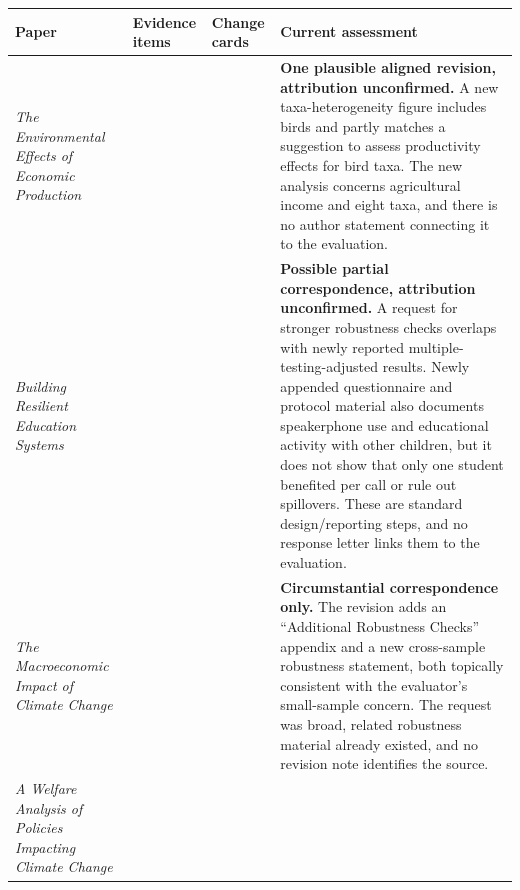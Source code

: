 \documentclass[
  11pt,
  letterpaper,
]{article}
\begin{document}
\begin{longtable}[]{@{}
  >{\raggedright\arraybackslash}p{}
  >{\raggedleft\arraybackslash}p{}
  >{\raggedleft\arraybackslash}p{}
  >{\raggedright\arraybackslash}p{}@{}}
\toprule\noalign{}
\begin{minipage}[b]{\linewidth}\raggedright
Paper
\end{minipage} & \begin{minipage}[b]{\linewidth}\raggedleft
Evidence items
\end{minipage} & \begin{minipage}[b]{\linewidth}\raggedleft
Change cards
\end{minipage} & \begin{minipage}[b]{\linewidth}\raggedright
Current assessment
\end{minipage} \\
\midrule\noalign{}
\endhead
\bottomrule\noalign{}
\endlastfoot
\emph{The Environmental Effects of Economic Production} & 4 & 28 &
\textbf{One plausible aligned revision, attribution unconfirmed.} A new
taxa-heterogeneity figure includes birds and partly matches a suggestion
to assess productivity effects for bird taxa. The new analysis concerns
agricultural income and eight taxa, and there is no author statement
connecting it to the evaluation. \\
\emph{Building Resilient Education Systems} & 10 & 10 & \textbf{Possible
partial correspondence, attribution unconfirmed.} A request for stronger
robustness checks overlaps with newly reported multiple-testing-adjusted
results. Newly appended questionnaire and protocol material also
documents speakerphone use and educational activity with other children,
but it does not show that only one student benefited per call or rule
out spillovers. These are standard design/reporting steps, and no
response letter links them to the evaluation. \\
\emph{The Macroeconomic Impact of Climate Change} & 6 & 7 &
\textbf{Circumstantial correspondence only.} The revision adds an
``Additional Robustness Checks'' appendix and a new cross-sample
robustness statement, both topically consistent with the evaluator's
small-sample concern. The request was broad, related robustness material
already existed, and no revision note identifies the source. \\
\emph{A Welfare Analysis of Policies Impacting Climate Change} & 25 & 6

\end{longtable}
\end{document}
